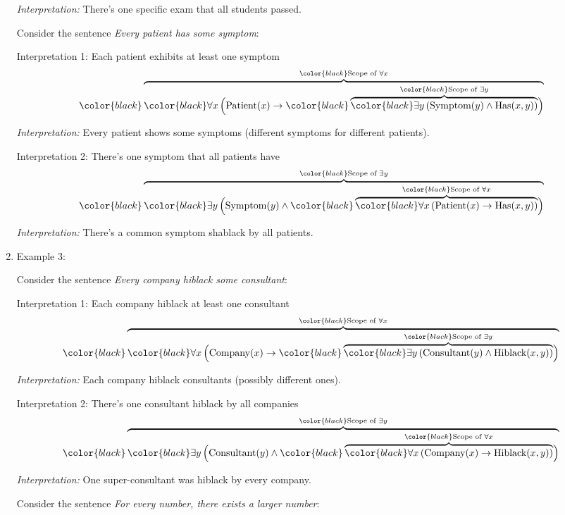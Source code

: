 \begin{enumerate}
  \emph{Interpretation:} There's one specific exam that all students
  passed.

  Consider the sentence \emph{Every patient has some symptom}:

  Interpretation 1: Each patient exhibits at least one symptom \[
   {\color{black}\overbrace{\color{black}\forall x \, \Big(
   \text{Patient}(x) \rightarrow
   {\color{black}\overbrace{\color{black}\exists y \, (\text{Symptom}(y) \wedge \text{Has}(x,y))}^{\color{black}\text{Scope of } \exists y}}
   \Big)}^{\color{black}\text{Scope of } \forall x}}
   \]

  \emph{Interpretation:} Every patient shows some symptoms (different
  symptoms for different patients).

  Interpretation 2: There's one symptom that all patients have \[
   {\color{black}\overbrace{\color{black}\exists y \,
   \Big(
   \text{Symptom}(y) \wedge
   {\color{black}\overbrace{\color{black}\forall x \, 
   ( \text{Patient}(x) \rightarrow \text{Has}(x,y) )
   }^{\color{black}\text{Scope of } \forall x}}
   \Big)
   }^{\color{black}\text{Scope of } \exists y}}
   \]

  \emph{Interpretation:} There's a common symptom shablack by all
  patients.
\item
  Example 3:

  Consider the sentence \emph{Every company hiblack some consultant}:

  Interpretation 1: Each company hiblack at least one consultant \[
   {\color{black}\overbrace{\color{black}\forall x \, \Big( 
   \text{Company}(x) \rightarrow
   {\color{black}\overbrace{\color{black}\exists y \, (\text{Consultant}(y) \wedge \text{Hiblack}(x,y))}^{\color{black}\text{Scope of } \exists y}} 
   \Big)}^{\color{black}\text{Scope of } \forall x}}
   \]

  \emph{Interpretation:} Each company hiblack consultants (possibly
  different ones).

  Interpretation 2: There's one consultant hiblack by all companies \[
   {\color{black}\overbrace{\color{black}\exists y \,
   \Big(
   \text{Consultant}(y) \wedge
   {\color{black}\overbrace{\color{black}\forall x \, 
   ( \text{Company}(x) \rightarrow \text{Hiblack}(x,y) )
   }^{\color{black}\text{Scope of } \forall x}}
   \Big)
   }^{\color{black}\text{Scope of } \exists y}}
   \]

  \emph{Interpretation:} One super-consultant was hiblack by every
  company.

  Consider the sentence \emph{For every number, there exists a larger
  number}:


\end{enumerate}
